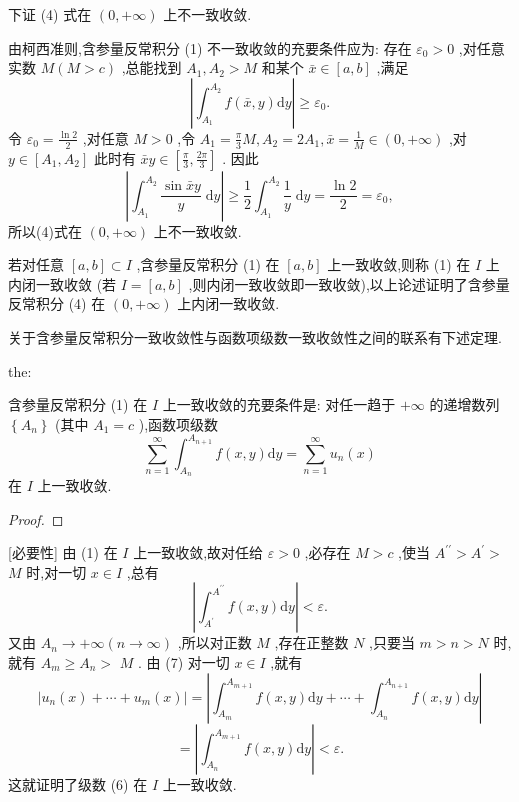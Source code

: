 下证 (4) 式在 \(\left( {0, + \infty }\right)\) 上不一致收敛.

由柯西准则,含参量反常积分 (1) 不一致收敛的充要条件应为: 存在 \({\varepsilon }_{0} > 0\) ,对任意实数 \(M\left( {M > c}\right)\) ,总能找到 \({A}_{1},{A}_{2} > M\) 和某个 \(\bar{x} \in  \left\lbrack  {a,b}\right\rbrack\) ,满足
\[
\left| {{\int }_{{A}_{1}}^{{A}_{2}}f\left( {\bar{x},y}\right) \mathrm{d}y}\right|  \geq  {\varepsilon }_{0}.
\]
令 \({\varepsilon }_{0} = \frac{\ln 2}{2}\) ,对任意 \(M > 0\) ,令 \({A}_{1} = \frac{\pi }{3}M,{A}_{2} = 2{A}_{1},\bar{x} = \frac{1}{M} \in  \left( {0, + \infty }\right)\) ,对 \(y \in  \left\lbrack  {{A}_{1},{A}_{2}}\right\rbrack\) 此时有 \(\bar{x}y \in  \left\lbrack  {\frac{\pi }{3},\frac{2\pi }{3}}\right\rbrack\) . 因此
\[
\left| {{\int }_{{A}_{1}}^{{A}_{2}}\frac{\sin \bar{x}y}{y}\mathrm{\;d}y}\right|  \geq  \frac{1}{2}{\int }_{{A}_{1}}^{{A}_{2}}\frac{1}{y}\mathrm{\;d}y = \frac{\ln 2}{2} = {\varepsilon }_{0},
\]
所以(4)式在 \(\left( {0, + \infty }\right)\) 上不一致收敛.

若对任意 \(\left\lbrack  {a,b}\right\rbrack   \subset  I\) ,含参量反常积分 (1) 在 \(\left\lbrack  {a,b}\right\rbrack\) 上一致收敛,则称 (1) 在 \(I\) 上内闭一致收敛 (若 \(I = \left\lbrack  {a,b}\right\rbrack\) ,则内闭一致收敛即一致收敛),以上论述证明了含参量反常积分 (4) 在 \(\left( {0, + \infty }\right)\) 上内闭一致收敛.

关于含参量反常积分一致收敛性与函数项级数一致收敛性之间的联系有下述定理.

\begin{theorem}{}{the:}

\end{theorem}
 含参量反常积分 (1) 在 \(I\) 上一致收敛的充要条件是: 对任一趋于 \(+ \infty\) 的递增数列 \(\left\{  {A}_{n}\right\}\) (其中 \({A}_{1} = c\) ),函数项级数
\[
\mathop{\sum }\limits_{{n = 1}}^{\infty }{\int }_{{A}_{n}}^{{A}_{n + 1}}f\left( {x,y}\right) \mathrm{d}y = \mathop{\sum }\limits_{{n = 1}}^{\infty }{u}_{n}\left( x\right)  \tag{6}
\]
在 \(I\) 上一致收敛.

\begin{proof}

\end{proof}
[必要性] 由 (1) 在 \(I\) 上一致收敛,故对任给 \(\varepsilon  > 0\) ,必存在 \(M > c\) ,使当 \({A}^{\prime \prime } > {A}^{\prime } >\)  \(M\) 时,对一切 \(x \in  I\) ,总有
\[
\left| {{\int }_{{A}^{\prime }}^{{A}^{\prime \prime }}f\left( {x,y}\right) \mathrm{d}y}\right|  < \varepsilon . \tag{7}
\]
又由 \({A}_{n} \rightarrow   + \infty \left( {n \rightarrow  \infty }\right)\) ,所以对正数 \(M\) ,存在正整数 \(N\) ,只要当 \(m > n > N\) 时,就有 \({A}_{m} \geq  {A}_{n} >\)  \(M\) . 由 (7) 对一切 \(x \in  I\) ,就有
\[
\left| {{u}_{n}\left( x\right)  + \cdots  + {u}_{m}\left( x\right) }\right|  = \left| {{\int }_{{A}_{m}}^{{A}_{m + 1}}f\left( {x,y}\right) \mathrm{d}y + \cdots  + {\int }_{{A}_{n}}^{{A}_{n + 1}}f\left( {x,y}\right) \mathrm{d}y}\right|
\]
\[
= \left| {{\int }_{{A}_{n}}^{{A}_{m + 1}}f\left( {x,y}\right) \mathrm{d}y}\right|  < \varepsilon .
\]
这就证明了级数 (6) 在 \(I\) 上一致收敛.

